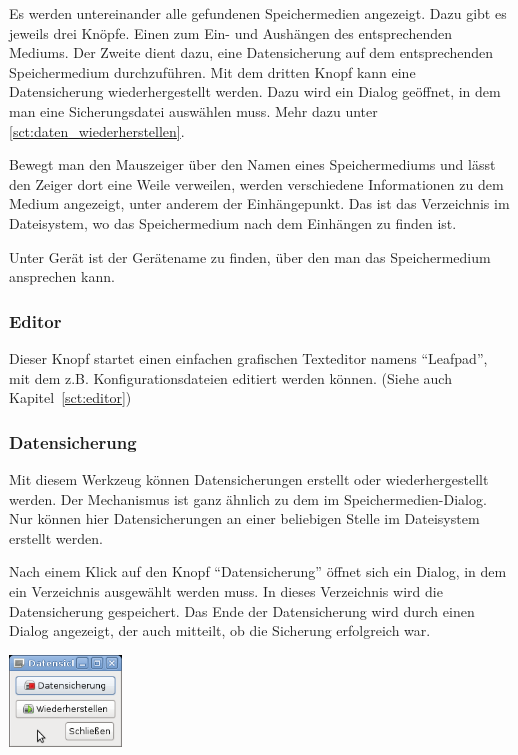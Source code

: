 \documentclass[a4paper,12pt,twoside]{article}
\begin{document}
Es werden untereinander alle gefundenen Speichermedien angezeigt. Dazu
gibt es jeweils drei Knöpfe. Einen zum Ein- und Aushängen des
entsprechenden Mediums. Der Zweite dient dazu, eine Datensicherung auf
dem entsprechenden Speichermedium durchzuführen. Mit dem dritten Knopf
kann eine Datensicherung wiederhergestellt werden. Dazu wird ein Dialog
geöffnet, in dem man eine Sicherungsdatei auswählen muss. Mehr dazu unter
\ref{sct:daten_wiederherstellen}.

Bewegt man den Mauszeiger über den Namen eines Speichermediums und lässt
den Zeiger dort eine Weile verweilen, werden verschiedene Informationen
zu dem Medium angezeigt, unter anderem der Einhängepunkt. Das ist das
Verzeichnis im Dateisystem, wo das Speichermedium nach dem Einhängen zu
finden ist.

Unter Gerät ist der Gerätename zu finden, über den man das
Speichermedium ansprechen kann.


\subsubsection{Editor}
\label{sct:gui_editor}
Dieser Knopf startet einen einfachen
grafischen Texteditor namens "`Leafpad"', mit
dem z.B. Konfigurationsdateien editiert werden können. (Siehe auch
Kapitel~\ref{sct:editor})


\subsubsection{Datensicherung}
\label{sct:dialog_datensicherung}
Mit diesem Werkzeug können
Datensicherungen erstellt oder wiederhergestellt werden. Der
Mechanismus ist ganz ähnlich zu dem im Speichermedien-Dialog. Nur
können hier Datensicherungen an einer beliebigen Stelle im Dateisystem
erstellt werden.

Nach einem Klick auf den Knopf
"`Datensicherung"' öffnet sich ein Dialog, in
dem ein Verzeichnis ausgewählt werden muss. In dieses Verzeichnis wird
die Datensicherung gespeichert. Das Ende der Datensicherung wird durch
einen Dialog angezeigt, der auch mitteilt, ob die Sicherung erfolgreich
war.

\bigskip
\begin{minipage}{\linewidth}
    \centering
    \captionsetup{type=figure}
    \includegraphics[width=3cm]{screenshots/efaLivede-img21.png}
    \label{fig:dialog_datensicherung}
\end{minipage}
\bigskip
\end{document}
